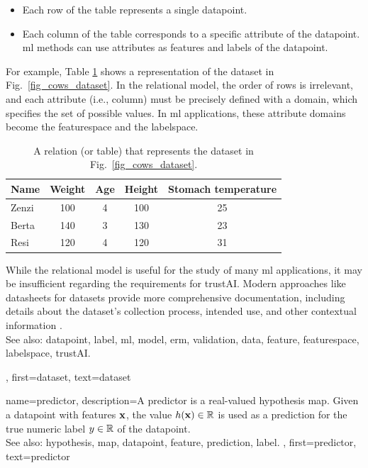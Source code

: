 {{		\begin{itemize} 
		\item Each row of the table represents a single \gls{datapoint}.
		\item Each column of the table corresponds to a specific attribute of the \gls{datapoint}. 
		\gls{ml} methods can use attributes as \glspl{feature} and \glspl{label} of the \gls{datapoint}.
		\end{itemize}
		For example, Table \ref{tab:cowdata} shows a representation of the dataset in Fig.\ \ref{fig_cows_dataset}. 
		In the relational \gls{model}, the order of rows is irrelevant, and each attribute (i.e., column) must be 
		precisely defined with a domain, which specifies the set of possible values. In \gls{ml} applications, 
		these attribute domains become the \gls{featurespace} and the \gls{labelspace}.
		\begin{table}[H]
			\centering
			\begin{tabular}{lcccc}
				\hline
				\textbf{Name} & \textbf{Weight} & \textbf{Age} & \textbf{Height} & \textbf{Stomach temperature} \\
				\hline
				Zenzi & 100 & 4 & 100 & 25 \\
				Berta & 140 & 3 & 130 & 23 \\
				Resi  & 120 & 4 & 120 & 31 \\
				\hline
			\end{tabular}
			\caption{A relation (or table) that represents the dataset in Fig.\ \ref{fig_cows_dataset}.}
			\label{tab:cowdata}
		\end{table}
 		While the relational \gls{model} is useful for the study of many \gls{ml} applications, it may be 
 		insufficient regarding the requirements for \gls{trustAI}. Modern 
 		approaches like datasheets for datasets provide more comprehensive 
 		documentation, including details about the dataset’s collection process, intended 
 		use, and other contextual information \cite{DatasheetData2021}.
 		\\
		See also: \gls{datapoint}, \gls{label}, \gls{ml}, \gls{model}, \gls{erm}, \gls{validation}, \gls{data}, \gls{feature}, \gls{featurespace}, \gls{labelspace}, \gls{trustAI}.},
	first={dataset},
	text={dataset}  
}

{name={predictor},
	description={A predictor is a real-valued \gls{hypothesis} \gls{map}. 
		Given a \gls{datapoint} with \glspl{feature} ${\bf x}$, the value 
		$h({\bf x}) \in \mathbb{R}$ is used as a \gls{prediction} for the true 
		numeric \gls{label} $y \in \mathbb{R}$ of the \gls{datapoint}.
				\\
		See also: \gls{hypothesis}, \gls{map}, \gls{datapoint}, \gls{feature}, \gls{prediction}, \gls{label}. },
	first={predictor},
	text={predictor}  
}

